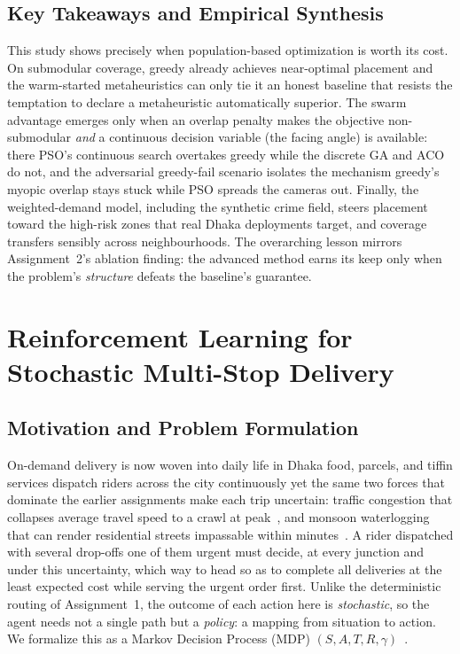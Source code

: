 \documentclass{ai-lab-report}
\begin{document}
\subsection{Key Takeaways and Empirical Synthesis}
This study shows precisely when population-based optimization is worth its cost. On submodular coverage, greedy already achieves near-optimal placement and the warm-started metaheuristics can only tie it an honest baseline that resists the temptation to declare a metaheuristic automatically superior. The swarm advantage emerges only when an overlap penalty makes the objective non-submodular \emph{and} a continuous decision variable (the facing angle) is available: there PSO's continuous search overtakes greedy while the discrete GA and ACO do not, and the adversarial greedy-fail scenario isolates the mechanism greedy's myopic overlap stays stuck while PSO spreads the cameras out. Finally, the weighted-demand model, including the synthetic crime field, steers placement toward the high-risk zones that real Dhaka deployments target, and coverage transfers sensibly across neighbourhoods. The overarching lesson mirrors Assignment~2's ablation finding: the advanced method earns its keep only when the problem's \emph{structure} defeats the baseline's guarantee.

\section{Reinforcement Learning for Stochastic Multi-Stop Delivery}
\label{subsec:a3rl}\label{sec:rl}

\subsection{Motivation and Problem Formulation}
\label{sec:a4formulation}

On-demand delivery is now woven into daily life in Dhaka food, parcels, and tiffin services dispatch riders across the city continuously yet the same two forces that dominate the earlier assignments make each trip uncertain: traffic congestion that collapses average travel speed to a crawl at peak~\citep{worldbank2018dhaka,dailystar2018congestion}, and monsoon waterlogging that can render residential streets impassable within minutes~\citep{dailystar2025waterlogging}. A rider dispatched with several drop-offs one of them urgent must decide, at every junction and under this uncertainty, which way to head so as to complete all deliveries at the least expected cost while serving the urgent order first. Unlike the deterministic routing of Assignment~1, the outcome of each action here is \emph{stochastic}, so the agent needs not a single path but a \emph{policy}: a mapping from situation to action. We formalize this as a Markov Decision Process (MDP) $(S,A,T,R,\gamma)$~\citep{sutton2018rl,bellman1957dynamic}.
\end{document}
